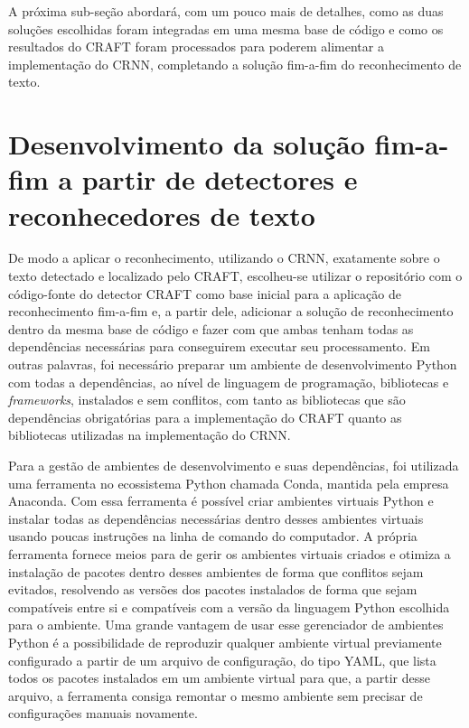 A próxima sub-seção abordará, com um pouco mais de detalhes, como as duas soluções escolhidas foram integradas em uma mesma base de código e como os 
resultados do CRAFT foram processados para poderem alimentar a implementação do CRNN, completando a solução fim-a-fim do reconhecimento de texto. 

\section{Desenvolvimento da solução fim-a-fim a partir de detectores e reconhecedores de texto}\label{sec:metodologia_desenvolvimento}

De modo a aplicar o reconhecimento, utilizando o CRNN, exatamente sobre o texto detectado e localizado pelo CRAFT, escolheu-se utilizar o repositório com 
o código-fonte do detector CRAFT como base inicial para a aplicação de reconhecimento fim-a-fim e, a partir dele, adicionar a solução de reconhecimento 
dentro da mesma base de código e fazer com que ambas tenham todas as dependências necessárias para conseguirem executar seu processamento. Em outras palavras, 
foi necessário preparar um ambiente de desenvolvimento Python com todas a dependências, ao nível de linguagem de programação, bibliotecas e 
\textit{frameworks}, instalados e sem conflitos, com tanto as bibliotecas que são dependências obrigatórias para a implementação do CRAFT quanto as 
bibliotecas utilizadas na implementação do CRNN.

Para a gestão de ambientes de desenvolvimento e suas dependências, foi utilizada uma ferramenta no ecossistema Python chamada Conda, mantida pela empresa 
Anaconda. Com essa ferramenta é possível criar ambientes virtuais Python e instalar todas as dependências necessárias dentro desses ambientes virtuais 
usando poucas instruções na linha de comando do computador. A própria ferramenta fornece meios para de gerir os ambientes virtuais criados e otimiza a 
instalação de pacotes dentro desses ambientes de forma que conflitos sejam evitados, resolvendo as versões dos pacotes instalados de forma que sejam 
compatíveis entre si e compatíveis com a versão da linguagem Python escolhida para o ambiente. Uma grande vantagem de usar esse gerenciador de ambientes 
Python é a possibilidade de reproduzir qualquer ambiente virtual previamente configurado a partir de um arquivo de configuração, do tipo YAML, que lista 
todos os pacotes instalados em um ambiente virtual para que, a partir desse arquivo, a ferramenta consiga remontar o mesmo ambiente sem precisar de 
configurações manuais novamente.

